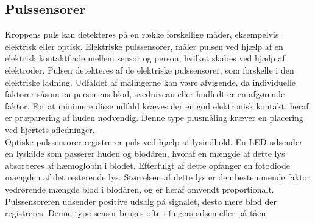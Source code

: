 \subsection{Pulssensorer}
Kroppens puls kan detekteres på en række forskellige måder, eksempelvis elektrisk eller optisk.
Elektriske pulssensorer, måler pulsen ved hjælp af en elektrisk kontaktflade mellem sensor og person, hvilket skabes ved hjælp af elektroder. Pulsen detekteres af de elektriske pulssensorer, som forskelle i den elektriske ladning. Udfaldet af målingerne kan være afvigende, da individuelle faktorer såsom en personens blod, svedniveau eller hudfedt er en afgørende faktor. For at minimere disse udfald kræves der en god elektronisk kontakt, heraf er præparering af huden nødvendig. Denne type plusmåling kræver en placering ved hjertets afledninger. \citep{PhuaLissorguesMercier2009}  \\
Optiske pulssensorer registrerer puls ved hjælp af lysindhold. En LED udsender en lyskilde som passerer huden og blodåren, hvoraf en mængde af dette lys absorberes af hæmoglobin i blodet. Efterfulgt af dette opfanger en fotodiode mængden af det resterende lys. Størrelsen af dette lys er den bestemmende faktor vedrørende mængde blod i blodåren, og er heraf omvendt proportionalt. Pulssensoreren udsender positive udsalg på signalet, desto mere blod der registreres. Denne type sensor bruges ofte i fingerspidsen eller på tåen.\citep{PhuaLissorguesMercier2009,SrinivasReddySrinivas2006} 

%
	


